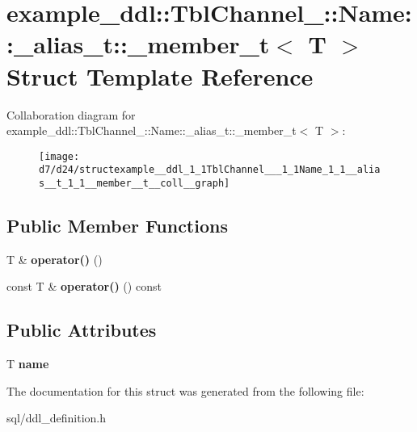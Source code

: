 \hypertarget{structexample__ddl_1_1TblChannel___1_1Name_1_1__alias__t_1_1__member__t}{}\section{example\+\_\+ddl\+:\+:Tbl\+Channel\+\_\+\+:\+:Name\+:\+:\+\_\+alias\+\_\+t\+:\+:\+\_\+member\+\_\+t$<$ T $>$ Struct Template Reference}
\label{structexample__ddl_1_1TblChannel___1_1Name_1_1__alias__t_1_1__member__t}


Collaboration diagram for example\+\_\+ddl\+:\+:Tbl\+Channel\+\_\+\+:\+:Name\+:\+:\+\_\+alias\+\_\+t\+:\+:\+\_\+member\+\_\+t$<$ T $>$\+:
\nopagebreak
\begin{figure}[H]
\begin{center}
\leavevmode
\texttt{[image: d7/d24/structexample\_\_ddl\_1\_1TblChannel\_\_\_1\_1Name\_1\_1\_\_alias\_\_t\_1\_1\_\_member\_\_t\_\_coll\_\_graph]}
\end{center}
\end{figure}
\subsection*{Public Member Functions}
\begin{DoxyCompactItemize}
\item 
\hypertarget{structexample__ddl_1_1TblChannel___1_1Name_1_1__alias__t_1_1__member__t_a3d5553c4dcc03a560ee458c91b3c87ca}{}T \& {\bfseries operator()} ()\label{structexample__ddl_1_1TblChannel___1_1Name_1_1__alias__t_1_1__member__t_a3d5553c4dcc03a560ee458c91b3c87ca}

\item 
\hypertarget{structexample__ddl_1_1TblChannel___1_1Name_1_1__alias__t_1_1__member__t_aa343d1e49ce0fbe2891cb1bf1edc40dc}{}const T \& {\bfseries operator()} () const \label{structexample__ddl_1_1TblChannel___1_1Name_1_1__alias__t_1_1__member__t_aa343d1e49ce0fbe2891cb1bf1edc40dc}

\end{DoxyCompactItemize}
\subsection*{Public Attributes}
\begin{DoxyCompactItemize}
\item 
\hypertarget{structexample__ddl_1_1TblChannel___1_1Name_1_1__alias__t_1_1__member__t_a8e0716d1eb455690395056d0d4ebe7f5}{}T {\bfseries name}\label{structexample__ddl_1_1TblChannel___1_1Name_1_1__alias__t_1_1__member__t_a8e0716d1eb455690395056d0d4ebe7f5}

\end{DoxyCompactItemize}


The documentation for this struct was generated from the following file\+:\begin{DoxyCompactItemize}
\item 
sql/ddl\+\_\+definition.\+h\end{DoxyCompactItemize}
